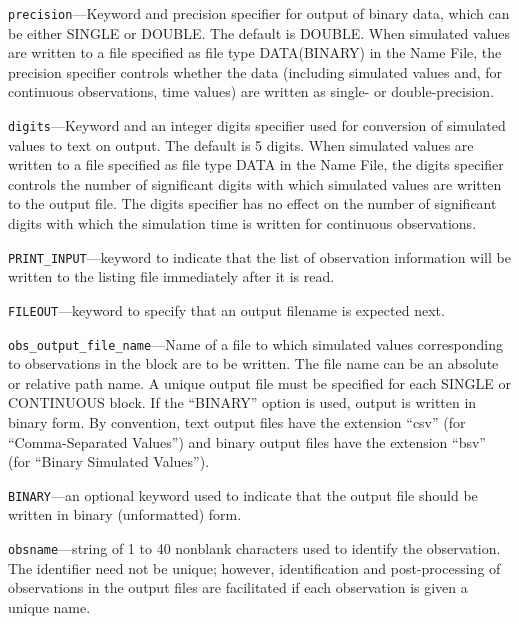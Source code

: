 
\item \texttt{precision}---Keyword and precision specifier for output of binary data, which can be either SINGLE or DOUBLE. The default is DOUBLE. When simulated values are written to a file specified as file type DATA(BINARY) in the Name File, the precision specifier controls whether the data (including simulated values and, for continuous observations, time values) are written as single- or double-precision.

\item \texttt{digits}---Keyword and an integer digits specifier used for conversion of simulated values to text on output. The default is 5 digits. When simulated values are written to a file specified as file type DATA in the Name File, the digits specifier controls the number of significant digits with which simulated values are written to the output file. The digits specifier has no effect on the number of significant digits with which the simulation time is written for continuous observations.

\item \texttt{PRINT\_INPUT}---keyword to indicate that the list of observation information will be written to the listing file immediately after it is read.

\item \texttt{FILEOUT}---keyword to specify that an output filename is expected next.

\item \texttt{obs\_output\_file\_name}---Name of a file to which simulated values corresponding to observations in the block are to be written. The file name can be an absolute or relative path name. A unique output file must be specified for each SINGLE or CONTINUOUS block. If the ``BINARY'' option is used, output is written in binary form. By convention, text output files have the extension ``csv'' (for ``Comma-Separated Values'') and binary output files have the extension ``bsv'' (for ``Binary Simulated Values'').

\item \texttt{BINARY}---an optional keyword used to indicate that the output file should be written in binary (unformatted) form.

\item \texttt{obsname}---string of 1 to 40 nonblank characters used to identify the observation. The identifier need not be unique; however, identification and post-processing of observations in the output files are facilitated if each observation is given a unique name.

